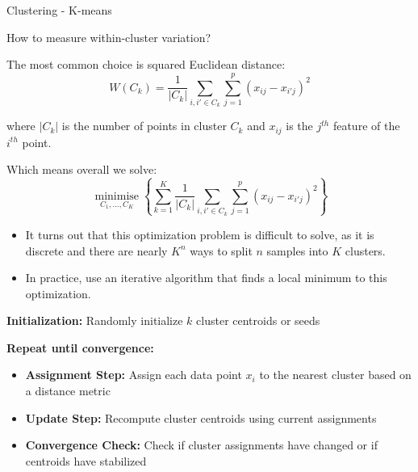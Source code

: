 \begin{frame}[allowframebreaks]{Clustering - K-means}
\framebreak

\begin{block}{}
    How to measure within-cluster variation? 

    \vspace{0.5em}

    The most common choice is squared Euclidean distance:
        \begin{equation}
            W(C_k) = \frac{1}{|C_k|} \sum_{i, i' \in C_k} \sum_{j=1}^{p} (x_{ij} - x_{i'j})^2
        \end{equation}
    
        where $|C_k|$ is the number of points in cluster $C_k$ and $x_{ij}$ is the $j^{th}$ feature of the $i^{th}$ point.
    
    \vspace{0.5em}
    
    Which means overall we solve:
        \begin{equation}
            \operatorname*{minimise}_{C_1, \ldots, C_K} \left\{ \sum_{k=1}^{K} \frac{1}{|C_k|} \sum_{i, i' \in C_k} \sum_{j=1}^{p} (x_{ij} - x_{i'j})^2 \right\}
        \end{equation}
\end{block}

\framebreak

\begin{itemize}
    \setlength{\itemsep}{0.5em}
    \item It turns out that this optimization problem is difficult to solve, as it is  discrete and there are nearly $K^n$	ways to split $n$ samples into $K$ clusters.
    \item In practice, use an iterative algorithm that finds a local minimum to this  optimization.
\end{itemize}

\framebreak

\begingroup\setlength{\parfillskip}{0pt plus 1fil}%
\begin{algorithm}[H]
\caption{K-means Clustering Algorithm}

\vspace{0.8em}

\textbf{Initialization:} Randomly initialize $k$ cluster centroids or seeds\;

\vspace{0.8em}

\textbf{Repeat until convergence:}
\begin{itemize}
    \item \textbf{Assignment Step:} Assign each data point $x_i$ to the nearest cluster based on a distance metric\;
    \vspace{0.5em}
    \item \textbf{Update Step:} Recompute cluster centroids using current assignments\;
    \vspace{0.5em}
    \item \textbf{Convergence Check:} Check if cluster assignments have changed or if centroids have stabilized\;
\end{itemize}


\end{algorithm}
\end{frame}
